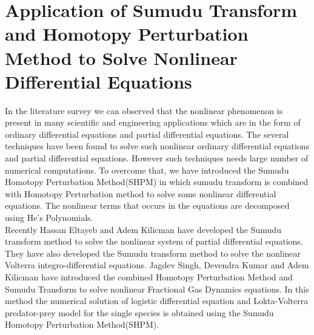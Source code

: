 \section{Application of Sumudu Transform and  Homotopy Perturbation Method to Solve Nonlinear Differential Equations}
In the literature survey we can observed that the nonlinear phenomenon is present in many scientific and engineering applications which are in the form of ordinary differential equations and partial differential equations. The several techniques have been found to solve such nonlinear ordinary differential equations and partial differential equations. However such techniques needs large number of numerical computations. To overcome that, we have introduced the Sumudu Homotopy Perturbation Method(SHPM) in which sumudu transform is combined with Homotopy Perturbation method to solve some nonlinear differential equations. The  nonlinear terms that occurs in the equations are decomposed using He's Polynomials.\cite{R47}\\
Recently Hassan Eltayeb and Adem Kilicman\cite{R43,R44} have developed the Sumudu transform method to solve the nonlinear system of partial differential equations. They have also developed the Sumudu transform method to solve the nonlinear Volterra integro-differential equations. Jagdev Singh, Devendra Kumar and Adem Kilicman \cite{R48} have introduced the combined Homotopy Perturbation Method and Sumudu Transform to solve nonlinear Fractional Gas Dynamics equations. In this method the numerical solution of logistic differential equation and Lokta-Volterra predator-prey model for the single species is obtained using the  Sumudu Homotopy Perturbation Method(SHPM).
